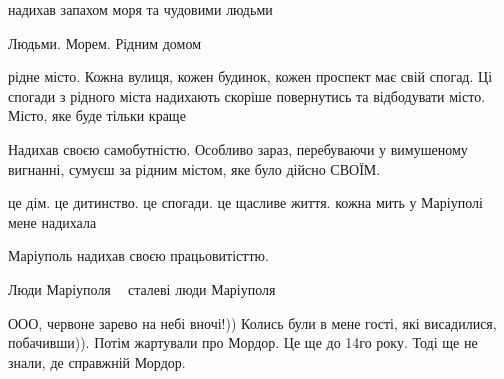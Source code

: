 
надихав запахом моря та чудовими людьми


Людьми. Морем. Рідним домом


рідне місто. Кожна вулиця, кожен будинок, кожен проспект має свій спогад. Ці
спогади з рідного міста надихають скоріше повернутись та відбодувати місто.
Місто, яке буде тільки краще


Надихав своєю самобутністю. Особливо зараз, перебуваючи у вимушеному вигнанні,
сумуєш за рідним містом, яке було дійсно СВОЇМ.


це дім. це дитинство. це спогади. це щасливе життя. кожна мить у Маріуполі мене
надихала


Маріуполь надихав своєю працьовитісттю.


Люди Маріуполя 💙💛 сталеві люди Маріуполя


ООО, червоне зарево на небі вночі!)) Колись були в мене гості, які висадилися,
побачивши)). Потім жартували про Мордор. Це ще до 14го року. Тоді ще не знали,
де справжній Мордор.
